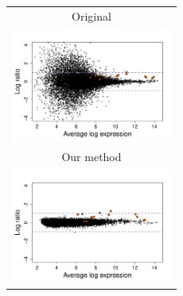 \documentclass[11pt, letterpaper]{article}
\begin{document}
\begin{center}
  \begin{tabular}{c}
    Original \vspace{-1.7em}\\
      \includegraphics[width=200px]{rma2.pdf}\\
     \vspace{-0.5em} Our method \vspace{-1em}\\
      \includegraphics[width=200px]{rma3.pdf}
  \end{tabular}
\end{center}
\end{document}
